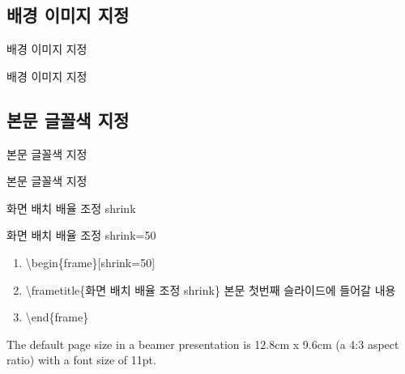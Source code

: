 \documentclass[10pt,blue,xcolor=pdftex,dvipsnames,table,handout]{beamer}
\begin{document}
		\subsection{배경 이미지 지정}
		\begin{frame}[shrink=0]{배경 이미지 지정}

			\begin{block} {배경 이미지 지정}
			\end{block}
		\end{frame}


		\subsection{본문 글꼴색 지정}
		\begin{frame}[shrink=0]{본문 글꼴색 지정}

			\begin{block} {본문 글꼴색 지정}
			\end{block}
		\end{frame}






		\begin{frame}[shrink=50]{화면 배치 배율 조정 shrink}
			
			\begin{block} {화면 배치 배율 조정 shrink=50}

			\begin{enumerate}
			\item[]	\textbackslash begin\{frame\}[shrink=50]
			\item[]	\textbackslash frametitle\{화면 배치 배율 조정 shrink\}
					본문 첫번째 슬라이드에 들어갈 내용\\
			\item[]	\textbackslash end\{frame\}
			\end{enumerate}

			\end{block}

			The default page size in a beamer presentation is 12.8cm x 9.6cm (a 4:3 aspect ratio) with a font size of 11pt.

		\end{frame}
\end{document}
